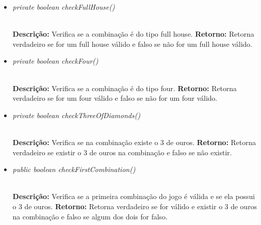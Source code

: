 \documentclass[12pt]{article}
\begin{document}
\vspace{0.2 true cm}

\begin{itemize}
\item \begin{large}\textit{private boolean checkFullHouse()}\end{large}\\
\subitem \textbf{Descrição:} Verifica se a combinação é do tipo full house.
\subitem \textbf{Retorno:} Retorna verdadeiro se for um full house válido e falso se não for um full house válido.
\end{itemize}

\vspace{0.2 true cm}

\begin{itemize}
\item \begin{large}\textit{private boolean checkFour()}\end{large}\\
\subitem \textbf{Descrição:} Verifica se a combinação é do tipo four.
\subitem \textbf{Retorno:} Retorna verdadeiro se for um four válido e falso se não for um four válido.
\end{itemize}

\vspace{0.2 true cm}

\begin{itemize}
\item \begin{large}\textit{private boolean checkThreeOfDiamonds()}\end{large}\\
\subitem \textbf{Descrição:} Verifica se na combinação existe o 3 de ouros.
\subitem \textbf{Retorno:} Retorna verdadeiro se existir o 3 de ouros na combinação e falso se não existir.
\end{itemize}

\vspace{0.2 true cm}

\begin{itemize}
\item \begin{large}\textit{public boolean checkFirstCombination()}\end{large}\\
\subitem \textbf{Descrição:} Verifica se a primeira combinação do jogo é válida e se ela possui o 3 de ouros.
\subitem \textbf{Retorno:} Retorna verdadeiro se for válido e existir o 3 de ouros na combinação e falso se algum dos dois for falso.
\end{itemize}
\end{document}
